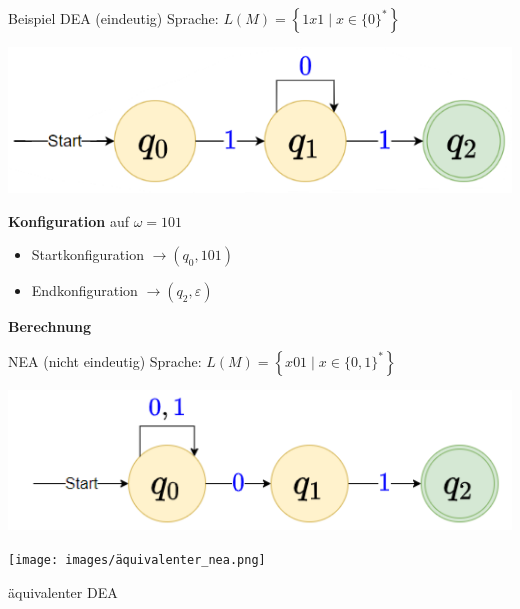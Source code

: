 



\begin{example2}{Beispiel DEA (eindeutig)} Sprache: $L(M)=\left\{1 x 1 \mid x \in\{0\}^{*}\right\}$
    
    \begin{minipage}{0.45\linewidth}
        \includegraphics[width=1\linewidth]{images/dea_example.png}
    \end{minipage}
    \hspace{1mm}
    \begin{minipage}{0.5\linewidth}
        \textbf{Konfiguration} auf $\omega=101$
        \begin{itemize}
        \item Startkonfiguration $\rightarrow\left(q_{0}, 101\right)$
        \item Endkonfiguration $\rightarrow\left(q_{2}, \varepsilon\right)$
        \end{itemize}
    \end{minipage}

    \textbf{Berechnung}


\end{example2}

\begin{example2}{NEA (nicht eindeutig)} Sprache: $L(M)=\left\{x 01 \mid x \in\{0,1\}^{*}\right\}$
    
    \begin{minipage}{0.55\linewidth}
        \includegraphics[width=1\linewidth]{images/nea_example1.png}
    \end{minipage}
    \hspace{1mm}
    \begin{minipage}{0.4\linewidth}
        \texttt{[image: images/äquivalenter\_nea.png]}
        
        äquivalenter DEA
    \end{minipage}    
\end{example2}


